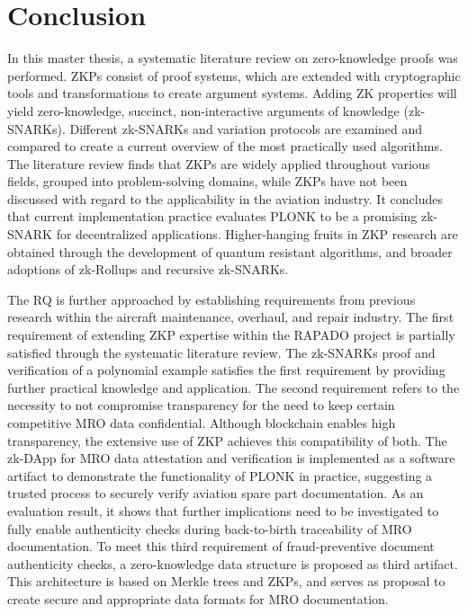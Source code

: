 \chapter{Conclusion}
In this master thesis, a systematic literature review on zero-knowledge proofs was performed. ZKPs consist of proof systems, which are extended with cryptographic tools and transformations to create argument systems. Adding ZK properties will yield zero-knowledge, succinct, non-interactive arguments of knowledge (zk-SNARKs). Different zk-SNARKs and variation protocols are examined and compared to create a current overview of the most practically used algorithms. The literature review finds that ZKPs are widely applied throughout various fields, grouped into problem-solving domains, while ZKPs have not been discussed with regard to the applicability in the aviation industry. It concludes that current implementation practice evaluates PLONK to be a promising zk-SNARK for decentralized applications. Higher-hanging fruits in ZKP research are obtained through the development of quantum resistant algorithms, and broader adoptions of zk-Rollups and recursive zk-SNARKs.

The RQ is further approached by establishing requirements from previous research within the aircraft maintenance, overhaul, and repair industry. The first requirement of extending ZKP expertise within the RAPADO project is partially satisfied through the systematic literature review. The zk-SNARKs proof and verification of a polynomial example satisfies the first requirement by providing further practical knowledge and application. The second requirement refers to the necessity to not compromise transparency for the need to keep certain competitive MRO data confidential. Although blockchain enables high transparency, the extensive use of ZKP achieves this compatibility of both. The zk-DApp for MRO data attestation and verification is implemented as a software artifact to demonstrate the functionality of PLONK in practice, suggesting a trusted process to securely verify aviation spare part documentation. As an evaluation result, it shows that further implications need to be investigated to fully enable authenticity checks during back-to-birth traceability of MRO documentation. To meet this third requirement of fraud-preventive document authenticity checks, a zero-knowledge data structure is proposed as third artifact. This architecture is based on Merkle trees and ZKPs, and serves as proposal to create secure and appropriate data formats for MRO documentation.
\begin{comment}
hier zusammenfassung klassisch
1 SLR
- examined requirements: ...
2 example calc--> knowledge acc
3 zk-DApp--> transparency confidentiality
4 zk data structure --> appropriate data structure and authenticity 
\end{comment}





